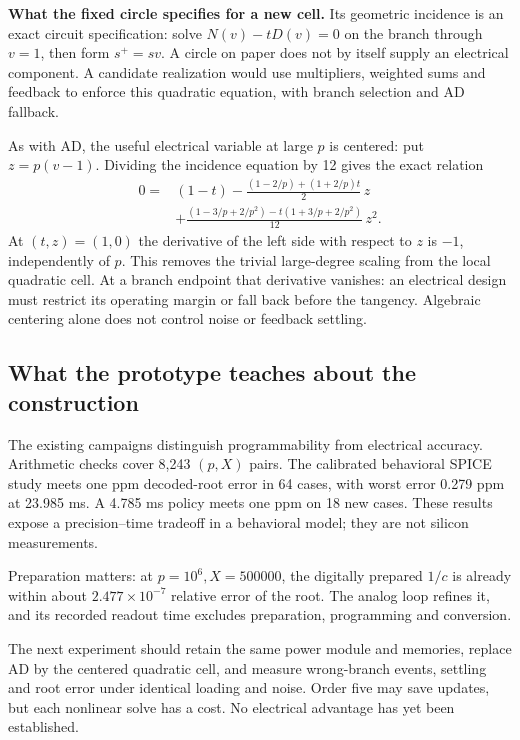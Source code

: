 \documentclass[11pt,a4paper]{article}
\begin{document}
\textbf{What the fixed circle specifies for a new cell.} Its geometric incidence is an exact circuit specification: solve $N(v)-tD(v)=0$ on the branch through $v=1$, then form $s^+=sv$. A circle on paper does not by itself supply an electrical component. A candidate realization would use multipliers, weighted sums and feedback to enforce this quadratic equation, with branch selection and AD fallback.

As with AD, the useful electrical variable at large $p$ is centered: put $z=p(v-1)$. Dividing the incidence equation by 12 gives the exact relation
\begin{align*}
 0={}&(1-t)-\frac{(1-2/p)+(1+2/p)t}{2}\,z\\
 &+\frac{(1-3/p+2/p^2)-t(1+3/p+2/p^2)}{12}\,z^2 .
\end{align*}
At $(t,z)=(1,0)$ the derivative of the left side with respect to $z$ is $-1$, independently of $p$. This removes the trivial large-degree scaling from the local quadratic cell. At a branch endpoint that derivative vanishes: an electrical design must restrict its operating margin or fall back before the tangency. Algebraic centering alone does not control noise or feedback settling.

\clearpage
\subsection{What the prototype teaches about the construction}
The existing campaigns distinguish programmability from electrical accuracy. Arithmetic checks cover 8,243 $(p,X)$ pairs. The calibrated behavioral SPICE study meets one ppm decoded-root error in 64 cases, with worst error 0.279 ppm at 23.985 ms. A 4.785 ms policy meets one ppm on 18 new cases. These results expose a precision--time tradeoff in a behavioral model; they are not silicon measurements.

Preparation matters: at $p=10^6,X=500000$, the digitally prepared $1/c$ is already within about $2.477\times10^{-7}$ relative error of the root. The analog loop refines it, and its recorded readout time excludes preparation, programming and conversion.

The next experiment should retain the same power module and memories, replace AD by the centered quadratic cell, and measure wrong-branch events, settling and root error under identical loading and noise. Order five may save updates, but each nonlinear solve has a cost. No electrical advantage has yet been established.
\end{document}
